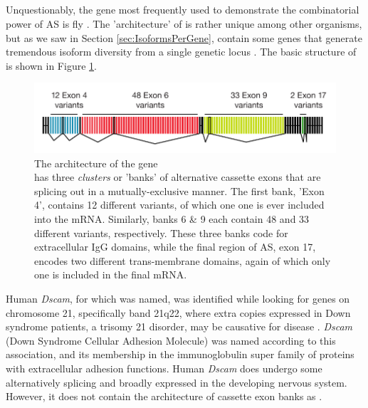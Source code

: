 

\subsection{\flies{} \dscam{}}\label{sec:Dscam}

Unquestionably, the gene most frequently used to demonstrate the combinatorial power of AS is fly \dscam{}. The 'architecture' of \dscam{} is rather unique among other organisms, but as we saw in Section \ref{sec:IsoformsPerGene}, contain some genes that generate tremendous isoform diversity from a single genetic locus \citep{Brown2014}. The basic structure of \dscam{} is shown in Figure \ref{fig:DscamArch}.

\begin{figure}[htbp]
	\centering 
	\includegraphics{Figures/Chapter1/DscamArch.pdf}
	\caption[The architecture of the \flies{} gene \dscam{}]
	{
		The architecture of the \flies{} gene \dscam{}\\[0.25cm]
		\dscam{} has three \textit{clusters} or 'banks' of alternative cassette exons that are splicing out in a mutually-exclusive manner. The first bank, 'Exon 4', contains 12 different variants, of which one one is ever included into the mRNA. Similarly, banks 6 \& 9 each contain 48 and 33 different variants, respectively. These three banks code for extracellular IgG domains, while the final region of AS, exon 17, encodes two different trans-membrane domains, again of which only one is included in the final mRNA.
	}
	\label{fig:DscamArch}
\end{figure}

Human \textit{Dscam}, for which \dscam{} was named, was identified while looking for genes on chromosome 21, specifically band 21q22, where extra copies expressed in Down syndrome patients, a trisomy 21 disorder, may be causative for disease \citep{Yamakawa1998b}. \textit{Dscam} (Down Syndrome Cellular Adhesion Molecule) was named according to this association, and its membership in the immunoglobulin super family of proteins with extracellular adhesion functions. Human \textit{Dscam} does undergo some alternatively splicing and broadly expressed in the developing nervous system. However, it does not contain the architecture of cassette exon banks as \dscam{}.

